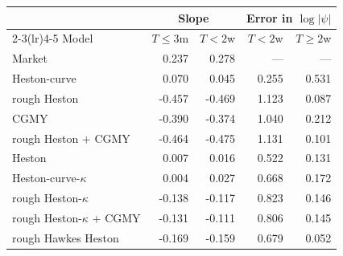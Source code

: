 \begin{tabular}{lrrrr}
\toprule
 & \multicolumn{2}{c}{Slope} & \multicolumn{2}{c}{Error in $\log|\psi|$}\\
\cmidrule(lr){2-3}\cmidrule(lr){4-5}
Model & $T\le 3$m & $T<2$w & $T<2$w & $T\ge 2$w\\
\midrule
Market & 0.237 & 0.278 & --- & ---\\
\addlinespace
Heston-curve & 0.070 & 0.045 & 0.255 & 0.531\\
rough Heston & -0.457 & -0.469 & 1.123 & 0.087\\
CGMY & -0.390 & -0.374 & 1.040 & 0.212\\
rough Heston + CGMY & -0.464 & -0.475 & 1.131 & 0.101\\
\addlinespace
Heston & 0.007 & 0.016 & 0.522 & 0.131\\
Heston-curve-$\kappa$ & 0.004 & 0.027 & 0.668 & 0.172\\
rough Heston-$\kappa$ & -0.138 & -0.117 & 0.823 & 0.146\\
rough Heston-$\kappa$ + CGMY & -0.131 & -0.111 & 0.806 & 0.145\\
rough Hawkes Heston & -0.169 & -0.159 & 0.679 & 0.052\\
\bottomrule
\end{tabular}
